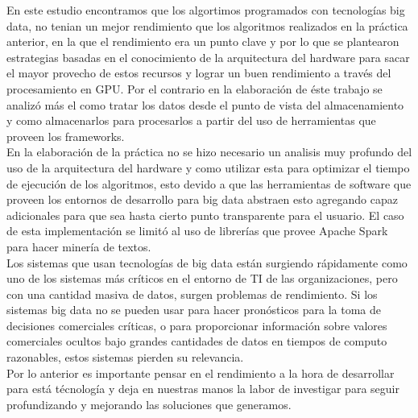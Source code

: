 \documentclass[conference,compsoc]{IEEEtran}
\begin{document}
En este estudio encontramos que los algortimos programados con tecnologías big data, no tenian un mejor rendimiento que los algoritmos realizados en la práctica anterior, en la que el rendimiento era un punto clave y por lo que se plantearon estrategias basadas en el conocimiento de la arquitectura del hardware para sacar el mayor provecho de estos recursos y lograr un buen rendimiento a través del procesamiento en GPU. Por el contrario en la elaboración de éste trabajo se analizó más el como tratar los datos desde el punto de vista del almacenamiento y como almacenarlos para procesarlos a partir del uso de herramientas que proveen los frameworks.\\

En la elaboración de la práctica no se hizo necesario un analisis muy profundo del uso de la arquitectura del hardware y como utilizar esta para optimizar el tiempo de ejecución de los algoritmos, esto devido a que las herramientas de software que proveen los entornos de desarrollo para big data abstraen esto agregando capaz adicionales para que sea hasta cierto punto transparente para el usuario. El caso de esta implementación se limitó al uso de librerías que provee Apache Spark para hacer minería de textos.\\

Los sistemas que usan tecnologías de big data están surgiendo rápidamente como uno de los sistemas más críticos en el entorno de TI de las organizaciones, pero con una cantidad masiva de datos, surgen problemas de rendimiento. Si los sistemas big data no se pueden usar para hacer pronósticos para la toma de decisiones comerciales críticas, o para proporcionar información sobre valores comerciales ocultos bajo grandes cantidades de datos en tiempos de computo razonables, estos sistemas pierden su relevancia.\\

Por lo anterior es importante pensar en el rendimiento a la hora de desarrollar para está técnología y deja en nuestras manos la labor de investigar para seguir profundizando y mejorando las soluciones que generamos.



\end{document}
